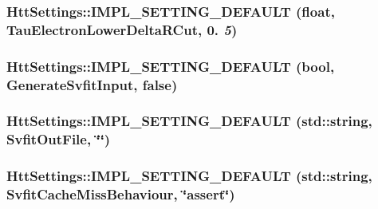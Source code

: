 \label{classHttSettings_a1d665e4d010863f0c9115b4b1070ca17}
\hypertarget{classHttSettings_ac08dfb991a30202ac452541b223d4f77}{
\subsubsection[{IMPL\_\-SETTING\_\-DEFAULT}]{\setlength{\rightskip}{0pt plus 5cm}HttSettings::IMPL\_\-SETTING\_\-DEFAULT (float, \/  TauElectronLowerDeltaRCut, \/  0. {\em 5})}}
\label{classHttSettings_ac08dfb991a30202ac452541b223d4f77}
\hypertarget{classHttSettings_a6c716fd3af2c6ef4c4710befb1f56a92}{
\subsubsection[{IMPL\_\-SETTING\_\-DEFAULT}]{\setlength{\rightskip}{0pt plus 5cm}HttSettings::IMPL\_\-SETTING\_\-DEFAULT (bool, \/  GenerateSvfitInput, \/  false)}}
\label{classHttSettings_a6c716fd3af2c6ef4c4710befb1f56a92}
\hypertarget{classHttSettings_a3dac9f43fcb3c7a5d70b58afda648707}{
\subsubsection[{IMPL\_\-SETTING\_\-DEFAULT}]{\setlength{\rightskip}{0pt plus 5cm}HttSettings::IMPL\_\-SETTING\_\-DEFAULT (std::string, \/  SvfitOutFile, \/  \char`\"{}\char`\"{})}}
\label{classHttSettings_a3dac9f43fcb3c7a5d70b58afda648707}
\hypertarget{classHttSettings_a958ee247569fa830756d0085db2a978f}{
\subsubsection[{IMPL\_\-SETTING\_\-DEFAULT}]{\setlength{\rightskip}{0pt plus 5cm}HttSettings::IMPL\_\-SETTING\_\-DEFAULT (std::string, \/  SvfitCacheMissBehaviour, \/  \char`\"{}assert\char`\"{})}}
\label{classHttSettings_a958ee247569fa830756d0085db2a978f}
